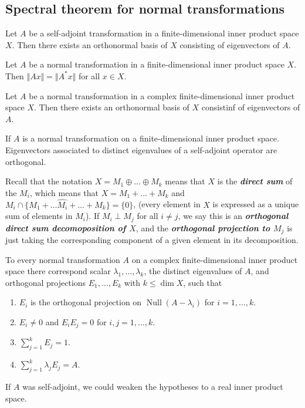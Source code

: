 \documentclass{article}
\theoremstyle{definition}
\numberwithin{equation}{section}
\begin{document}
	\subsection{Spectral theorem for normal transformations}
	\begin{thm}
		Let $A$ be a self-adjoint transformation in a finite-dimensional inner product space $X$. Then there exists an orthonormal basis of $X$ consisting of eigenvectors of $A$.
	\end{thm}
	\begin{lemma}
		Let $A$ be a normal transformation in a finite-dimensional inner product space $X$. Then $\Vert Ax\Vert=\Vert A^*x\Vert$ for all $x\in X$.
	\end{lemma}
	\begin{thm}
		Let $A$ be a normal transformation in a complex finite-dimensional inner product space $X$. Then there exists an orthonormal basis of $X$ consistinf of eigenvectors of $A$.
	\end{thm}
	\begin{thm}
		If $A$ is a normal transformation on a finite-dimensional inner product space. Eigenvectors associated to distinct eigenvalues of a self-adjoint operator are orthogonal.
	\end{thm}
	Recall that the notation $X=M_1\oplus\ldots\oplus M_k$ means that $X$ is the \textbf{\textit{direct sum}} of the $M_i$, which means that $X=M_1+\ldots+M_k$ and $M_i\cap\{M_1+\ldots \hat{M_i}+\ldots+M_k\}=\{0\}$, (every element in $X$ is expressed as a unique sum of elements in $M_i$). If $M_i\perp M_j$ for all $i\neq j$, we say this is an \textbf{\textit{orthogonal direct sum decomoposition of $X$}}, and the \textbf{\textit{orthogonal projection to $M_j$}} is just taking the corresponding component of a given element in its decomposition.
	\begin{thm}
		To every normal transformation $A$ on a complex finite-dimensional inner product space there correspond scalar $\lambda_1,\ldots,\lambda_k$, the distinct eigenvalues of $A$, and orthogonal projections $E_1,\ldots,E_k$ with $k\leq \dim X$, such that
		\begin{enumerate}
			\item $E_i$ is the orthogonal projection on $\operatorname{Null}(A-\lambda_i)$ for $i=1,\ldots,k$.
			\item $E_i\neq0$ and $E_iE_j=0$ for $i,j=1,\ldots,k$.
			\item $\sum_{j=1}^kE_j=1$.
			\item $\sum_{j=1}^k\lambda_jE_j=A$.
		\end{enumerate}
	\end{thm}
	If $A$ was self-adjoint, we could weaken the hypotheses to a real inner product space.
\end{document}
